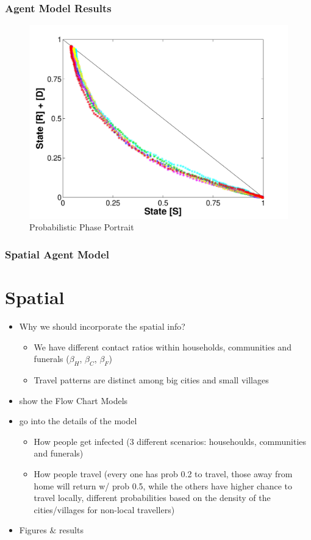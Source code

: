 \documentclass[30pt]{beamer}
\begin{document}
\begin{frame}
\frametitle{Agent Model Results}
\begin{figure}
  \includegraphics[scale=0.35]{PhasePortrait-eps-converted-to} \caption{Probabilistic Phase Portrait}
\end{figure}
\end{frame}



\begin{frame}
\frametitle{Spatial Agent Model}
\section{Spatial}
\begin{itemize}
\item Why we should incorporate the spatial info?
\begin{itemize}
\item We have different contact ratios within households, communities and funerals ($\beta_H$, $\beta_C$, $\beta_F$)
\item Travel patterns are distinct among big cities and small villages
\end{itemize}
\item show the Flow Chart Models
\item go into the details of the model
\begin{itemize}
\item How people get infected (3 different scenarios: househoulds, communities and funerals)
\item How people travel (every one has prob 0.2 to travel, those away from home will return w/ prob 0.5, while the others have higher chance to travel locally, different probabilities based on the density of the cities/villages for non-local travellers)
\end{itemize}
\item Figures $\&$ results
\end{itemize}

\end{frame}
\end{document}
